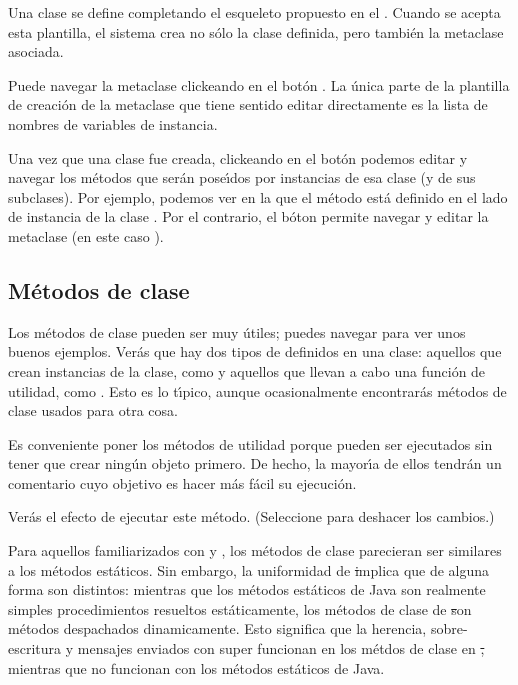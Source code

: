 \documentclass[a4paper,10pt,twoside]{book}
\begin{document}
Una clase se define completando el esqueleto propuesto en el  . 
Cuando se acepta esta plantilla, el sistema crea no s\'olo la clase definida, pero tambi\'en la metaclase asociada.

Puede navegar la metaclase clickeando en el bot\'on .
La \'unica parte de la plantilla de creaci\'on de la metaclase que tiene sentido editar directamente es la lista de nombres de variables de instancia.

Una vez que una clase fue creada, clickeando en el bot\'on  podemos editar y navegar los m\'etodos  que ser\'an pose\'\i{}dos por instancias de esa clase (y de sus subclases). Por ejemplo, podemos ver en la  que el m\'etodo  est\'a definido en el lado de instancia de la clase  .
Por el contrario, el b\'oton   permite navegar y editar la metaclase (en este caso ).

\subsection{M\'etodos de clase} 

Los m\'etodos de clase pueden ser muy \'utiles; puedes navegar  para ver unos buenos ejemplos.
Ver\'as que hay dos tipos de  definidos en una clase: aquellos que crean instancias de la clase, como  y aquellos que llevan a cabo una funci\'on de utilidad, como . 
Esto es lo t\'\i{}pico, aunque ocasionalmente encontrar\'as m\'etodos de clase usados para otra cosa.  

Es conveniente poner los m\'etodos de utilidad  porque pueden ser ejecutados sin tener que crear ning\'un objeto primero.
De hecho, la mayor\'\i{}a de ellos tendr\'an un comentario cuyo objetivo es hacer m\'as f\'acil su ejecuci\'on.

Ver\'as el efecto de ejecutar este m\'etodo. (Seleccione  para deshacer los cambios.)


Para aquellos familiarizados con  y , los m\'etodos de clase parecieran ser similares a los m\'etodos est\'aticos.
Sin embargo, la uniformidad de \st implica que de alguna forma son distintos: mientras que los m\'etodos est\'aticos de Java son realmente simples procedimientos resueltos est\'aticamente, los m\'etodos de clase de \st son m\'etodos despachados dinamicamente. 
Esto significa que la herencia, sobre-escritura y mensajes enviados con super funcionan en los m\'etdos de clase en \st, mientras que no funcionan con los m\'etodos est\'aticos de Java.
\end{document}
